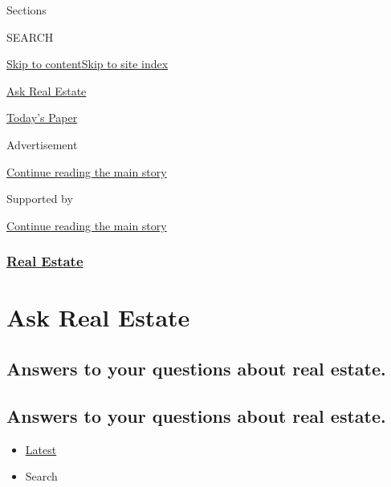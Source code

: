 Sections

SEARCH

\protect\hyperlink{site-content}{Skip to
content}\protect\hyperlink{site-index}{Skip to site index}

\href{https://www.nytimes.com/column/ask-real-estate}{Ask Real Estate}

\href{https://myaccount.nytimes.com/auth/login?response_type=cookie\&client_id=vi}{}

\href{https://www.nytimes.com/section/todayspaper}{Today's Paper}

Advertisement

\protect\hyperlink{after-top}{Continue reading the main story}

Supported by

\protect\hyperlink{after-sponsor}{Continue reading the main story}

\hypertarget{real-estate}{%
\subsubsection{\texorpdfstring{\href{/section/realestate}{Real
Estate}}{Real Estate}}\label{real-estate}}

\hypertarget{ask-real-estate}{%
\section{Ask Real Estate}\label{ask-real-estate}}

\hypertarget{answers-to-your-questions-about-real-estate}{%
\subsection{Answers to your questions about real
estate.}\label{answers-to-your-questions-about-real-estate}}

\hypertarget{answers-to-your-questions-about-real-estate-1}{%
\subsection{Answers to your questions about real
estate.}\label{answers-to-your-questions-about-real-estate-1}}

\begin{itemize}
\tightlist
\item
  \protect\hyperlink{stream-panel}{Latest}
\item
  Search
\end{itemize}


